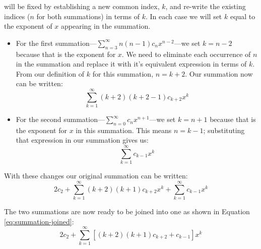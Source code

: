  will be fixed by establishing a new common index, $k$, and re-write the existing indices ($n$ for both summations) in terms of $k$.  In each case we will set $k$ equal to the exponent of $x$ appearing in the summation.
\begin{itemize}
\item For the first summation---$\sum\limits_{n=3}^{\infty} n(n-1)c_nx^{n-2}$---we set $k=n-2$ because that is the exponent for $x$. We need to eliminate each occurrence of $n$ in the summation and replace it with it's equivalent expression in terms of $k$.  From our definition of $k$ for this summation, $n=k+2$. Our summation now can be written:
$$\sum\limits_{k=1}^{\infty} (k+2)(k+2-1)c_{k+2}x^k$$ 

\item For the second summation---$\sum\limits_{n=0}^{\infty} c_n x^{n+1}$---we set $k=n+1$ because that is the exponent for $x$ in this summation.  This means $n=k-1$; substituting that expression in our summation gives us:
$$\sum\limits_{k=1}^{\infty}c_{k-1}x^{k}$$
\end{itemize}

With these changes our original summation can be written:
\begin{equation}
2c_2 + \sum\limits_{k=1}^{\infty} (k+2)(k+1)c_{k+2}x^k + \sum\limits_{k=1}^{\infty}c_{k-1}x^{k}
\end{equation}

The two summations are now ready to be joined into one as shown in Equation \ref{eq:summation-joined}:
\begin{equation}
2c_2 + \sum\limits_{k=1}^{\infty} \left[(k+2)(k+1)c_{k+2} + c_{k-1}\right] x^{k}
\label{eq:summation-joined}
\end{equation}

